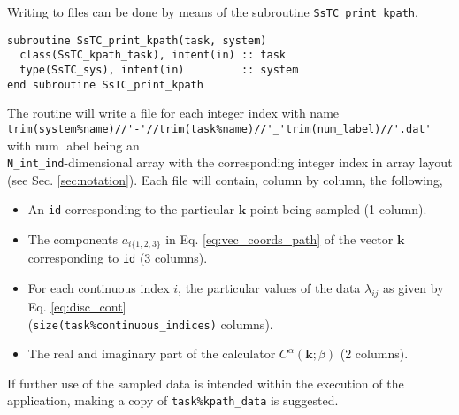 \documentclass[10pt,a4paper]{article}
\begin{document}
Writing to files can be done by means of the subroutine \verb|SsTC_print_kpath|.
\begin{lstlisting}[caption={Interface of the ``kpath" printer.},captionpos=b]
subroutine SsTC_print_kpath(task, system)
  class(SsTC_kpath_task), intent(in) :: task
  type(SsTC_sys), intent(in)         :: system
end subroutine SsTC_print_kpath
\end{lstlisting}
The routine will write a file for each integer index with name \\ \verb|trim(system%name)//'-'//trim(task%name)//'_'trim(num_label)//'.dat'| with num label being an \\ \verb|N_int_ind|-dimensional array with the corresponding integer index in array layout (see Sec. \ref{sec:notation}). Each file will contain, column by column, the following,
\begin{itemize}
\item An \verb|id| corresponding to the particular $\bm{k}$ point being sampled (1 column).
\item The components $a_{i\{1, 2, 3\}}$ in Eq. \eqref{eq:vec_coords_path} of the vector $\bm{k}$ corresponding to \verb|id| (3 columns).
\item For each continuous index $i$, the particular values of the data $\lambda_{ij}$ as given by Eq. \eqref{eq:disc_cont} \\ (\verb|size(task%continuous_indices)| columns).
\item The real and imaginary part of the calculator $C^{\alpha}(\bm{k};\beta)$ (2 columns).
\end{itemize}
If further use of the sampled data is intended within the execution of the application, making a copy of \verb|task%kpath_data| is suggested.
\end{document}
